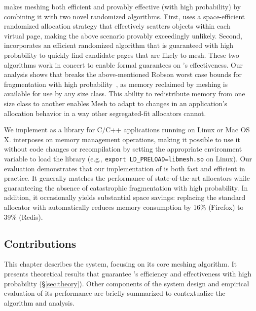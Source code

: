 \Mesh makes meshing both efficient and provably effective (with high
probability) by combining it with two novel randomized
algorithms. First, \Mesh uses a space-efficient randomized
allocation strategy that effectively scatters objects within each
virtual page, making the above scenario provably exceedingly
unlikely. Second, \Mesh incorporates an efficient randomized
algorithm that is guaranteed with high probability to quickly find
candidate pages that are likely to mesh. These two algorithms work in
concert to enable formal guarantees on \Mesh's effectiveness. Our
analysis shows that \Mesh breaks the above-mentioned Robson worst
case bounds for fragmentation with high
probability~\cite{robson:1977:worstcasefrag}, as memory reclaimed by meshing is available for use by any size class.
This ability to redistribute memory from one size class to another enables Mesh to adapt to changes in an application's allocation behavior in a way other segregated-fit allocators cannot.


We implement \Mesh as a library for C/C++ applications running on
Linux or Mac OS X. \Mesh{} interposes on memory management operations,
making it possible to use it without code changes or
recompilation by setting the appropriate environment variable to load
the \Mesh{} library (e.g., \texttt{export
  LD\_PRELOAD=libmesh.so} on Linux). Our evaluation demonstrates that
our implementation of \Mesh{} is both fast and efficient in
practice. It generally matches the performance of state-of-the-art
allocators while guaranteeing the absence of catastrophic
fragmentation with high probability. In addition, it occasionally
yields substantial space savings: replacing the standard allocator
with \Mesh{} automatically reduces memory consumption by 16\%
(Firefox) to 39\% (Redis).


\subsection{Contributions}
\label{sec:contributions}

This chapter describes the \Mesh system, focusing on its core meshing algorithm.  It presents theoretical results that guarantee \Mesh{}'s efficiency and effectiveness with high probability (\S\ref{sec:theory}).  Other components of the \Mesh system design and empirical evaluation of its performance are briefly summarized to contextualize the algorithm and analysis.

